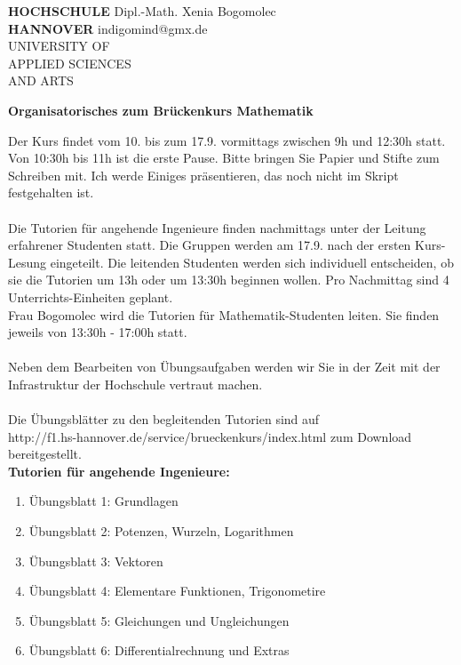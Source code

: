 \documentclass[12pt]{article}
\begin{document}
\pagestyle{empty}
\parindent 0cm
\begin{minipage}{14cm}
  \footnotesize{
  \textbf{HOCHSCHULE} \hfill Dipl.-Math. Xenia Bogomolec\\
  \textbf{HANNOVER}   \hfill indigomind@gmx.de  \\
  UNIVERSITY OF\\
  APPLIED SCIENCES\\
  AND ARTS
  }
\end{minipage}
\vspace{0.5cm}

{\large \bf Organisatorisches zum Br\"uckenkurs Mathematik}

\vspace{0.5cm}
\normalsize
\parindent0cm

Der Kurs findet vom 10. bis zum 17.9. vormittags zwischen 9h und 12:30h statt. Von 10:30h bis 11h ist die erste Pause. Bitte bringen Sie Papier und Stifte zum Schreiben mit. Ich werde Einiges pr\"asentieren, das noch nicht im Skript festgehalten ist. \\ \\
Die Tutorien f\"ur angehende Ingenieure finden nachmittags unter der Leitung erfahrener Studenten statt. Die Gruppen werden am 17.9. nach der ersten Kurs-Lesung eingeteilt. Die leitenden Studenten werden sich individuell entscheiden, ob sie die Tutorien um 13h oder um 13:30h beginnen wollen. Pro Nachmittag sind 4 Unterrichts-Einheiten geplant.\\
Frau Bogomolec wird die Tutorien f\"ur Mathematik-Studenten leiten. Sie finden jeweils von 13:30h - 17:00h statt. \\ \\ 
Neben dem Bearbeiten von \"Ubungsaufgaben werden wir Sie in der Zeit mit der Infrastruktur der Hochschule vertraut machen.\\ \\


Die \"Ubungsbl\"atter zu den begleitenden Tutorien sind auf \\
http://f1.hs-hannover.de/service/brueckenkurs/index.html zum Download be\-reit\-gestellt. \\

{\bf Tutorien f\"ur angehende Ingenieure:} 

\begin{enumerate}
  \item[] \"Ubungsblatt 1: Grundlagen
  \item[] \"Ubungsblatt 2: Potenzen, Wurzeln, Logarithmen
  \item[] \"Ubungsblatt 3: Vektoren
  \item[] \"Ubungsblatt 4: Elementare Funktionen, Trigonometire
  \item[] \"Ubungsblatt 5: Gleichungen und Ungleichungen
  \item[] \"Ubungsblatt 6: Differentialrechnung und Extras
\end{enumerate}
\end{document}
